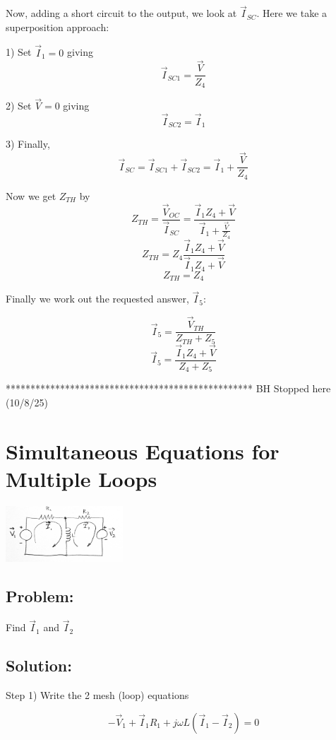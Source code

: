 \begin{ExampleCont}

Now, adding a short circuit to the output, we look at $\vec I_{SC}$.   Here we take a superposition approach:

1)  Set $\vec I_1 = 0$ giving
\[
\vec I_{SC1} = \frac {\vec V}{Z_4}
\]

2) Set $\vec V = 0$ giving
\[
\vec I_{SC2} = \vec I_1
\]

3) Finally,
\[
\vec I_{SC} = \vec I_{SC1} + \vec I_{SC2} = \vec I_1 +  \frac {\vec V}{Z_4}
\]

Now we get $Z_{TH}$ by
\[
Z_{TH} = \frac {\vec V_{OC}} {\vec I_{SC}} = \frac  {\vec I_1Z_4+\vec V}  {\vec I_1 +  \frac {\vec V}{Z_4}}
\]
\[
Z_{TH} = Z_4  \frac  {\vec I_1Z_4+\vec V}  {\vec I_1Z_4 +  \vec V}
\]
\[\boxed{Z_{TH} = Z_4  }
\]


Finally we work out the requested answer, $\vec I_5$:

\[
\vec I_5 = \frac {\vec V_{TH}} {Z_{TH} + Z_5}
\]
\[\boxed{
\vec I_5 =  \frac{\vec I_1Z_4 + \vec V}  {Z_4+Z_5}   }
\]

\end{ExampleCont}
%


**************************************************  BH Stopped here (10/8/25)




\section{Simultaneous Equations for Multiple Loops}

\includegraphics[width=0.33\textwidth]{figsChapt02/KT62219.png}


\subsection*{Problem:}
Find $\vec{I}_1$ and $\vec{I}_2$

\subsection*{Solution:}
Step 1) Write the 2 mesh (loop) equations

\[-\vec{V}_1 + \vec{I}_1 R_1 + j\omega L(\vec{I}_1 - \vec{I}_2) = 0\]

